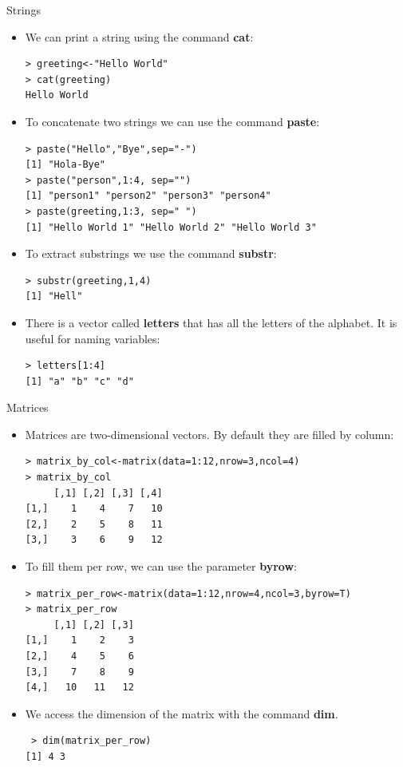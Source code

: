 \documentclass[handout]{beamer}
\begin{document}
\begin{frame}[fragile]{Strings}
\scriptsize{
 \begin{itemize}
  \item We can print a string using the command \textbf{cat}:
\begin{verbatim}
> greeting<-"Hello World"
> cat(greeting)
Hello World
\end{verbatim}

\item To concatenate two strings we can use the command \textbf{paste}:
\begin{verbatim}
> paste("Hello","Bye",sep="-")
[1] "Hola-Bye"
> paste("person",1:4, sep="")
[1] "person1" "person2" "person3" "person4"
> paste(greeting,1:3, sep=" ")
[1] "Hello World 1" "Hello World 2" "Hello World 3"
\end{verbatim}

\item To extract substrings we use the command \textbf{substr}:
\begin{verbatim}
> substr(greeting,1,4)
[1] "Hell" 
\end{verbatim}

\item There is a vector called \textbf{letters} that has all the letters of the alphabet. It is useful for naming variables:
\begin{verbatim}
> letters[1:4]
[1] "a" "b" "c" "d" 
\end{verbatim}


 \end{itemize}

 }
\end{frame}


\begin{frame}[fragile]{Matrices}
\scriptsize{
 \begin{itemize}
  \item Matrices are two-dimensional vectors. By default they are filled by column:
 \begin{verbatim}
> matrix_by_col<-matrix(data=1:12,nrow=3,ncol=4)
> matrix_by_col
     [,1] [,2] [,3] [,4]
[1,]    1    4    7   10
[2,]    2    5    8   11
[3,]    3    6    9   12 
 \end{verbatim}
 \item To fill them per row, we can use the parameter \textbf{byrow}:
 \begin{verbatim}
> matrix_per_row<-matrix(data=1:12,nrow=4,ncol=3,byrow=T)
> matrix_per_row
     [,1] [,2] [,3]
[1,]    1    2    3
[2,]    4    5    6
[3,]    7    8    9
[4,]   10   11   12  
 \end{verbatim}

 \item We access the dimension of the matrix with the command \textbf{dim}.
 \begin{verbatim}
 > dim(matrix_per_row)
[1] 4 3 
 \end{verbatim}

 \end{itemize} 
 }
\end{frame}
\end{document}
